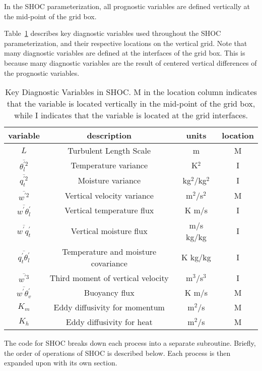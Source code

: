 \documentclass[12pt,titlepage]{article}
\numberwithin{equation}{section}
\begin{document}
In the SHOC parameterization, all prognostic variables are defined vertically at the mid-point of the grid box.  

Table~\ref{table:diagnostic} describes key diagnostic variables used throughout the SHOC parameterization, and their respective locations on the vertical grid.  Note that many diagnostic variables are defined at the interfaces of the grid box.  This is because many diagnostic variables are the result of centered vertical differences of the prognostic variables.  

\begin{table}[h]
\caption{Key Diagnostic Variables in SHOC.  M in the location column indicates that the variable is located vertically in the mid-point of the grid box, while I indicates that the variable is located at the grid interfaces.}
\centering
\begin{tabular}{c c c c}
\hline\hline
variable & description & units & location \\
\hline
$L$ & Turbulent Length Scale & m & M \\
$\overline{\theta_{l}^{'2}}$ & Temperature variance & K$^2$ & I \\
$\overline{q_{t}^{'2}}$ & Moisture variance & kg$^2$/kg$^2$ & I \\
$\overline{w^{'2}}$ & Vertical velocity variance & m$^2$/s$^2$ & M \\
$\overline{w^{'}\theta_{l}^{'}}$ & Vertical temperature flux & K m/s & I \\
$\overline{w^{'}q_{t}^{'}}$ & Vertical moisture flux & m/s kg/kg & I \\
$\overline{q_{t}^{'}\theta_{l}^{'}}$ & Temperature and moisture covariance & K kg/kg & I \\
$\overline{w^{'3}}$ & Third moment of vertical velocity &  m$^3$/s$^3$ & I \\
$\overline{w^{'}\theta_{v}^{'}}$ & Buoyancy flux & K m/s & M \\
$K_{m}$ & Eddy diffusivity for momentum & m$^2$/s & M \\
$K_{h}$ & Eddy diffusivity for heat & m$^2$/s & M \\
\hline
\end{tabular}
\label{table:diagnostic}
\end{table}  

The code for SHOC breaks down each process into a separate subroutine.  Briefly, the order of operations of SHOC is described below.  Each process is then expanded upon with its own section.
\end{document}
